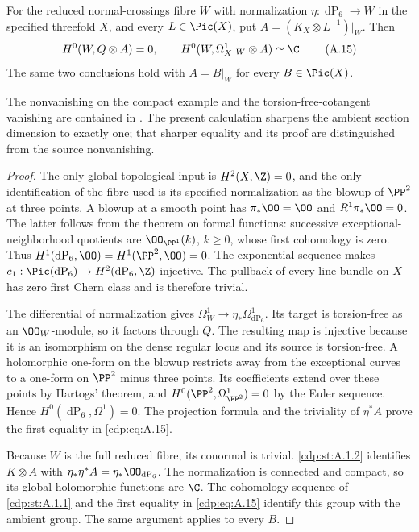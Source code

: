
\begin{proposition}\label{cdp:st:A.4.1}
For the reduced normal-crossings fibre $W$ with normalization $\eta:\operatorname{dP}_6\to W$ in the specified threefold $X$, and every $L\in\Pic(X)$, put $A=(K_X\otimes L^{-1})|_W$. Then
\[
H^0(W,Q\otimes A)=0,
\qquad H^0(W,\Omega_X^1|_W\otimes A)\simeq\C.
\tag{A.15}\label{cdp:eq:A.15}
\]
The same two conclusions hold with $A=B|_W$ for every $B\in\Pic(X)$.
\end{proposition}

The nonvanishing on the compact example and the torsion-free-cotangent vanishing are contained in \citet[Theorem~10.5 and Section~10.4]{AC2026}. The present calculation sharpens the ambient section dimension to exactly one; that sharper equality and its proof are distinguished from the source nonvanishing.

\begin{proof}
The only global topological input is $H^2(X,\Z)=0$, and the only identification of the fibre used is its specified normalization as the blowup of $\PP^2$ at three points. A blowup at a smooth point has $\pi_*\OO=\OO$ and $R^1\pi_*\OO=0$. The latter follows from the theorem on formal functions: successive exceptional-neighborhood quotients are $\OO_{\PP^1}(k)$, $k\ge0$, whose first cohomology is zero. Thus $H^1(\operatorname{dP}_6,\OO)=H^1(\PP^2,\OO)=0$. The exponential sequence makes $c_1:\Pic(\operatorname{dP}_6)\to H^2(\operatorname{dP}_6,\Z)$ injective. The pullback of every line bundle on $X$ has zero first Chern class and is therefore trivial.

The differential of normalization gives $\Omega_W^1\to\eta_*\Omega^1_{\operatorname{dP}_6}$. Its target is torsion-free as an $\OO_W$-module, so it factors through $Q$. The resulting map is injective because it is an isomorphism on the dense regular locus and its source is torsion-free. A holomorphic one-form on the blowup restricts away from the exceptional curves to a one-form on $\PP^2$ minus three points. Its coefficients extend over these points by Hartogs' theorem, and $H^0(\PP^2,\Omega^1_{\PP^2})=0$ by the Euler sequence. Hence $H^0(\operatorname{dP}_6,\Omega^1)=0$. The projection formula and the triviality of $\eta^*A$ prove the first equality in \eqref{cdp:eq:A.15}.

Because $W$ is the full reduced fibre, its conormal is trivial. \ref{cdp:st:A.1.2} identifies $K\otimes A$ with $\eta_*\eta^*A=\eta_*\OO_{\operatorname{dP}_6}$. The normalization is connected and compact, so its global holomorphic functions are $\C$. The cohomology sequence of \ref{cdp:st:A.1.1} and the first equality in \eqref{cdp:eq:A.15} identify this group with the ambient group. The same argument applies to every $B$.
\end{proof}


